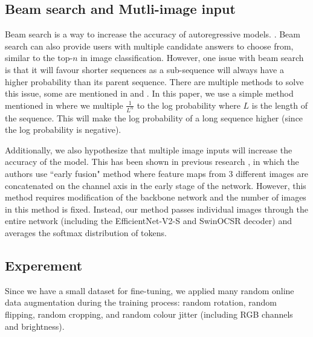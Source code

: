 \documentclass{article}
\begin{document}
\subsection{Beam search and Mutli-image input}
Beam search is a way to increase the accuracy of autoregressive models. \autocite{yang_breaking_2018} \autocite{zhang_beam_2024}. Beam search can also provide users with multiple candidate answers to choose from, similar to the top-$n$ in image classification. However, one issue with beam search is that it will favour shorter sequences as a sub-sequence will always have a higher probability than its parent sequence. \autocite{yang_breaking_2018} \autocite{zhang_beam_2024} There are multiple methods to solve this issue, some are mentioned in \autocite{yang_breaking_2018} and \autocite{zhang_beam_2024}. In this paper, we use a simple method mentioned in \autocite{zhang_beam_2024} where we multiple  $\frac{1}{L^\alpha}$ to the log probability where $L$ is the length of the sequence. This will make the log probability of a long sequence higher (since the log probability is negative). 

Additionally, we also hypothesize that multiple image inputs will increase the accuracy of the model. This has been shown in previous research \autocite{sun_multi-input_2017}, in which the authors use ``early fusion" method where feature maps from 3 different images are concatenated on the channel axis in the early stage of the network. However, this method requires modification of the backbone network and the number of images in this method is fixed. Instead, our method passes individual images through the entire network (including the EfficientNet-V2-S and SwinOCSR decoder) and averages the softmax distribution of tokens.  
\subsection{Experement}

Since we have a small dataset for fine-tuning, we applied many random online data augmentation during the training process: random rotation, random flipping, random cropping,  and random colour jitter (including RGB channels and brightness). 
\end{document}
